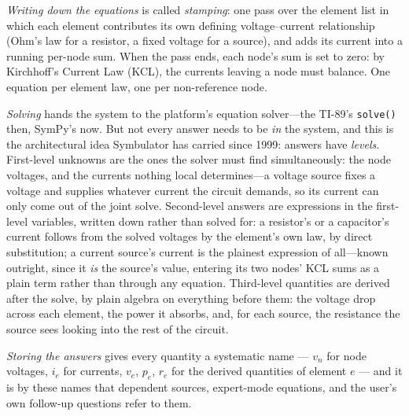 \documentclass[11pt,oneside]{report}
\newcommand{\code}[1]{\texttt{#1}}
\begin{document}
\emph{Writing down the equations} is called \emph{stamping}: one pass
over the element list in which each element contributes its own
defining voltage--current relationship (Ohm's law for a resistor, a
fixed voltage for a source), and adds its current into a running
per-node sum. When the pass ends, each node's sum is set to zero: by
Kirchhoff's Current Law (KCL), the currents leaving a node must
balance. One equation per element law, one per non-reference node.

\emph{Solving} hands the system to the platform's equation
solver---the TI-89's \code{solve()} then, SymPy's now. But not every
answer needs to be \emph{in} the system, and this is the architectural
idea Symbulator has carried since 1999: answers have
\emph{levels}. First-level unknowns are the ones the solver must find
simultaneously: the node voltages, and the currents nothing local
determines---a voltage source fixes a voltage and supplies whatever
current the circuit demands, so its current can only come out of the
joint solve. Second-level answers are expressions in the first-level
variables, written down rather than solved for: a resistor's or a
capacitor's current follows from the solved voltages by the element's
own law, by direct substitution; a current source's current is the
plainest expression of all---known outright, since it \emph{is} the
source's value, entering its two nodes' KCL sums as a plain term
rather than through any equation. Third-level quantities are derived
after the solve, by plain algebra on everything before them: the
voltage drop across each element, the power it absorbs, and, for
each source, the resistance the source sees looking into the rest of
the circuit.

\emph{Storing the answers} gives every quantity a systematic name ---
$v_n$ for node voltages, $i_e$ for currents, $v_e$, $p_e$, $r_e$ for
the derived quantities of element $e$ --- and it is by these names
that dependent sources, expert-mode equations, and the user's own
follow-up questions refer to them.
\end{document}
